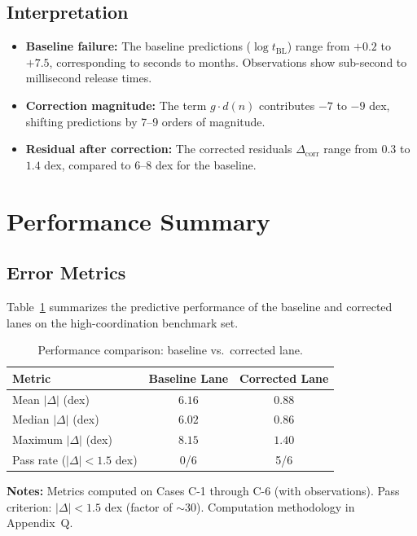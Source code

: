 \subsection{Interpretation}

\begin{itemize}
    \item \textbf{Baseline failure:} The baseline predictions ($\log t_{\text{BL}}$)
          range from $+0.2$ to $+7.5$, corresponding to seconds to months.
          Observations show sub-second to millisecond release times.
    \item \textbf{Correction magnitude:} The term $g \cdot d(n)$ contributes
          $-7$ to $-9$ dex, shifting predictions by 7--9 orders of magnitude.
    \item \textbf{Residual after correction:} The corrected residuals
          $\Delta_{\text{corr}}$ range from $0.3$ to $1.4$ dex, compared to
          $6$--$8$ dex for the baseline.
\end{itemize}

\section{Performance Summary}
\label{sec:sh:performance}

\subsection{Error Metrics}

Table~\ref{tab:sh:performance} summarizes the predictive performance of the
baseline and corrected lanes on the high-coordination benchmark set.

\begin{table}[h]
\centering
\caption{Performance comparison: baseline vs.\ corrected lane.}
\label{tab:sh:performance}
\begin{tabular}{lcc}
\toprule
Metric & Baseline Lane & Corrected Lane \\
\midrule
Mean $|\Delta|$ (dex) & $6.16$ & $0.88$ \\
Median $|\Delta|$ (dex) & $6.02$ & $0.86$ \\
Maximum $|\Delta|$ (dex) & $8.15$ & $1.40$ \\
Pass rate ($|\Delta| < 1.5$ dex) & 0/6 & 5/6 \\
\bottomrule
\end{tabular}

\vspace{2mm}
\footnotesize
\textbf{Notes:}
Metrics computed on Cases C-1 through C-6 (with observations).
Pass criterion: $|\Delta| < 1.5$ dex (factor of $\sim 30$).
Computation methodology in Appendix~Q. \tagDc
\end{table}


